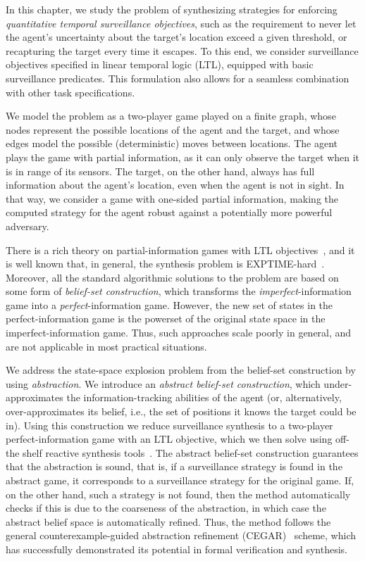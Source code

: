 In this chapter, we study the problem of synthesizing strategies for enforcing \emph{quantitative temporal surveillance objectives}, such as the requirement to never let the agent's uncertainty about the target's location exceed a given threshold, or recapturing the target every time it escapes. To this end, we consider surveillance objectives specified in linear temporal logic (LTL), equipped with basic surveillance predicates. This formulation also allows for a seamless combination with other task specifications.

We model the problem as a two-player game played on a finite graph, whose nodes represent the possible locations of the agent and the target, and whose edges model the possible (deterministic) moves between locations. The agent plays the game with partial information, as it can only observe the target when  it is in range of its sensors. The target, on the other hand, always has full information about the agent's location, even when the agent is not in sight. In that way, we consider a game with one-sided partial information, making the computed strategy for the agent robust against a potentially more powerful adversary. 

There is a rich theory on partial-information games with LTL objectives~\cite{DoyenR11,Chatterjee2013}, and it is well known that, in general, the synthesis problem is EXPTIME-hard~\cite{Reif84,BerwangerD08}. Moreover, all the standard algorithmic solutions to the problem are based on some form of \emph{belief-set construction}, which transforms the \emph{imperfect}-information game into a \emph{perfect}-information game. However, the new set of states in the perfect-information game is the powerset of the original state space in the imperfect-information game. Thus, such approaches scale poorly in general, and are not applicable in most practical situations.

We address the state-space explosion problem from the belief-set construction by using \emph{abstraction}. We introduce an \emph{abstract belief-set construction}, which under-approximates the information-tracking abilities of the agent (or, alternatively, over-approximates its belief, i.e., the set of positions it knows the target could be in). Using this construction we reduce surveillance synthesis to a two-player perfect-information game with an LTL objective, which we then solve using off-the shelf reactive synthesis tools~\cite{EhlersR16}. The abstract belief-set construction guarantees that the abstraction is sound, that is, if a surveillance strategy is found in the abstract game, it corresponds to a surveillance strategy for the original game. If, on the other hand, such a strategy is not found, then the method automatically checks if this is due to the coarseness of the abstraction, in which case the abstract belief space is automatically refined. Thus, the method follows the general counterexample-guided abstraction refinement (CEGAR)~\cite{ClarkeGJLV00} scheme, which has successfully demonstrated its potential in formal verification and synthesis.

